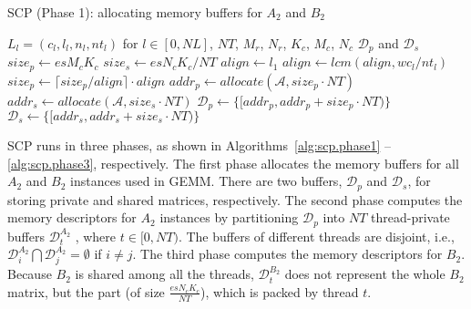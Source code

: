 \begin{algorithm}
  \caption{SCP (Phase 1): allocating memory buffers
  for $A_2$ and $B_2$}
  \label{alg:scp.phase1}
  \begin{algorithmic}[1]
    \REQUIRE $L_l = (c_l,l_l,n_l,nt_l)$ for $l \in [0, NL]$, $NT$,
    $M_r$, $N_r$, $K_c$, $M_c$, $N_c$
    \ENSURE $\mathcal{D}_p$ and $\mathcal{D}_s$ 
    \STATE $size_p \gets es M_c K_c$ \label{line:size.p}
    \STATE $size_s \gets es N_c K_c / NT$ \label{line:size.s}
    \STATE $align \gets l_1$ \label{line:align.init}
     \label{line:align.for}
     \label{line:align.type}
    \STATE $align \gets lcm(align, wc_l / nt_l)$ \label{line:align.update}
    \ENDIF
    \ENDFOR \label{line:align.endfor}
    \STATE $size_p \gets \lceil size_p / align \rceil \cdot align$ \label{line:align}
    \STATE $addr_p \gets allocate(\mathcal{A}, size_p \cdot NT)$ \label{line:alloc.begin}
    \STATE $addr_s \gets allocate(\mathcal{A}, size_s \cdot NT)$ \label{line:alloc.end}
    \STATE $\mathcal{D}_p \gets \lbrace [addr_p, addr_p + size_p \cdot NT) \rbrace$ \label{line:d.begin}
    \STATE $\mathcal{D}_s \gets \lbrace [addr_s, addr_s + size_s \cdot NT) \rbrace$ \label{line:d.end}
  \end{algorithmic}
\end{algorithm}

SCP runs in three phases, as shown in 
Algorithms~\ref{alg:scp.phase1} -- \ref{alg:scp.phase3},
respectively.  The first phase allocates the
memory buffers for all $A_2$ and $B_2$
instances used in GEMM. There are two buffers, $\mathcal{D}_p$ and $\mathcal{D}_s$,
for storing private and shared matrices, respectively.
The second phase computes the 
memory descriptors for $A_2$ instances
by partitioning $\mathcal{D}_p$ into $NT$ thread-private buffers
$\mathcal{D}_t^{A_2}$ , where $t \in [0, NT)$.
The buffers of different threads are disjoint,
i.e., $\mathcal{D}_i^{A_2} \bigcap \mathcal{D}_j^{A_2} = \emptyset$ if $i \ne j$.
The third phase computes the
memory descriptors for $B_2$.
Because $B_2$ is shared among all the threads,
$\mathcal{D}_t^{B_2}$ does not represent the whole $B_2$ matrix,
but the part (of size $\frac{es N_c K_c}{NT}$),
which is packed by thread $t$.

